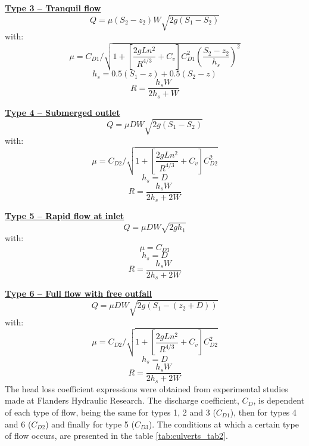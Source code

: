 \underline{\textbf{Type 3 -- Tranquil flow}}\\
\begin{equation}
Q=\mu (S_2-z_2)W\sqrt{2g(S_1-S_2 )}
\end{equation}
with:
\begin{equation}
\mu = C_{D1}/\sqrt{ 1+\left[\dfrac{2gLn^2}{R^{4/3}} +C_v \right] C_{D1}^2 \left(\dfrac{S_2-z_2}{h_s}\right)^2}
\end{equation}
\begin{equation}
h_s=0.5(S_1-z)+0.5(S_2-z)
\end{equation}
\begin{equation}
  R=\dfrac{h_sW}{2h_s+W}
\end{equation}

\underline{\textbf{Type 4 -- Submerged outlet}}\\
\begin{equation}
Q =\mu D W \sqrt{2g(S_1-S_2)}
\end{equation}
with:
\begin{equation}
\mu = C_{D2}/\sqrt{1+\left[\dfrac{2gLn^2}{R^{4/3}} +C_v \right] C_{D2}^2}
\end{equation}
\begin{equation}
h_s=D
\end{equation}
\begin{equation}
R=\dfrac{h_s W}{2h_s+2W}
\end{equation}

\underline{\textbf{Type 5 -- Rapid flow at inlet}}\\
\begin{equation}
Q= \mu D W \sqrt{2gh_1}
\end{equation}
with:
\begin{equation}
\mu = C_{D3}
\end{equation}
\begin{equation}
h_s = D
\end{equation}
\begin{equation}
R = \dfrac{h_s W}{2h_s+2W}
\end{equation}

\underline{\textbf{Type 6 -- Full flow with free outfall}}\\
\begin{equation}
Q = \mu D W \sqrt{2g(S_1-(z_2+D))}
\end{equation}
with:
\begin{equation}
\mu = C_{D2}/\sqrt{1+\left[\dfrac{2gLn^2}{R^{4/3}} +C_v \right] C_{D2}^2}
\end{equation}
\begin{equation}
h_s=D
\end{equation}
\begin{equation}
R=\dfrac{h_s W}{2h_s+2W}
\end{equation}
The head loss coefficient expressions were obtained from experimental studies made at
Flanders Hydraulic Research.
The discharge coefficient, $C_D$, is dependent of each type of flow, being the same for
types 1, 2 and 3 ($C_{D1}$), then for types 4 and 6 ($C_{D2}$) and finally for type 5 ($C_{D3}$).
The conditions at which a certain type of flow occurs,
are presented in the table \ref{tab:culverts_tab2}.

